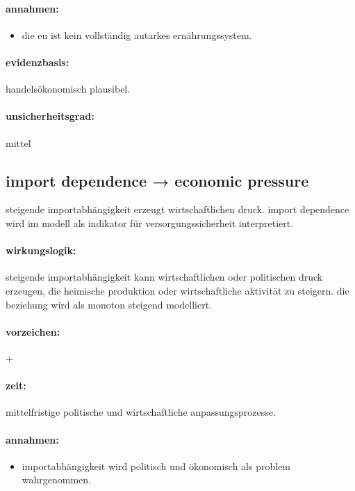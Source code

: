 \documentclass[11pt, a4paper, oneside]{scrartcl}
\begin{document}
\paragraph{annahmen:}
\begin{itemize}
\item die eu ist kein vollständig autarkes ernährungssystem.
\end{itemize}

\paragraph{evidenzbasis:}

handelsökonomisch plausibel.

\paragraph{unsicherheitsgrad:} 

mittel

\subsection{import dependence → economic pressure}
steigende importabhängigkeit erzeugt wirtschaftlichen druck. import dependence wird im modell als indikator für versorgungssicherheit interpretiert.

\paragraph{wirkungslogik:}

steigende importabhängigkeit kann wirtschaftlichen oder politischen druck erzeugen, die heimische produktion oder wirtschaftliche aktivität zu steigern.
die beziehung wird als monoton steigend modelliert.

\paragraph{vorzeichen:}

+

\paragraph{zeit:} 

mittelfristige politische und wirtschaftliche anpassungsprozesse.

\paragraph{annahmen:}
\begin{itemize}
\item importabhängigkeit wird politisch und ökonomisch als problem wahrgenommen.
\end{itemize}
\end{document}
